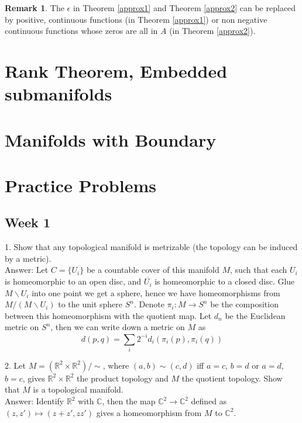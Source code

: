\documentclass{article}
\theoremstyle{definition}
\newtheorem{rmk}[thm]{Remark}
\begin{document}
\begin{rmk}
    The $\epsilon$ in Theorem \ref{approx1} and Theorem \ref{approx2} can be replaced by positive, continuous functions (in Theorem \ref{approx1}) or non negative continuous functions whose zeros are all in $A$ (in Theorem \ref{approx2}).
\end{rmk}

\section{Rank Theorem, Embedded submanifolds}

\section{Manifolds with Boundary}

\appendix

\section{Practice Problems}

\subsection{Week 1}

1. Show that any topological manifold is metrizable (the topology can be induced by a metric).\\

Answer: Let $C=\{U_i\}$ be a countable cover of this manifold $M$, such that each $U_i$ is homeomorphic to an open disc, and $\overline{U_i}$ is homeomorphic to a closed disc. Glue $M\backslash U_i$ into one point we get a sphere, hence we have homeomorphisms from $M/(M\backslash U_i)$ to the unit sphere $S^n$. Denote $\pi_i: M\rightarrow S^n$ be the composition between this homeomorphism with the quotient map. Let $d_n$ be the Euclidean metric on $S^n$, then we can write down a metric on $M$ as 
\[d(p, q)=\sum_i 2^{-i}d_i(\pi_i(p), \pi_i(q))\]

2. Let $M=(\mathbb{R}^2\times\mathbb{R}^2)/\sim$, where $(a, b)\sim (c, d)$ iff $a=c$, $b=d$ or $a=d$, $b=c$, gives $\mathbb{R}^2\times\mathbb{R}^2$ the product topology and $M$ the quotient topology. Show that $M$ is a topological manifold.\\

Answer: Identify $\mathbb{R}^2$ with $\mathbb{C}$, then the map $\mathbb{C}^2\rightarrow \mathbb{C}^2$ defined as $(z, z')\mapsto (z+z', zz')$ gives a homeomorphism from $M$ to $\mathbb{C}^2$.
\end{document}
